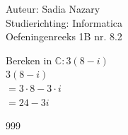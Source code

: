 \documentclass[a4paper]{article}
\begin{document}
  
\noindent \large Auteur: Sadia Nazary \\
\noindent \large Studierichting: Informatica\\
\noindent \large Oefeningenreeks 1B nr. 8.2\\

\medskip

\normalsize

Bereken in $\mathbb{C}: 3(8 - i)$\\

$3(8 - i)$\\

$= 3 \cdot 8 - 3 \cdot i$\\

$= 24 - 3i$

\begin{thebibliography}{999}
\end{thebibliography}
\end{document}
